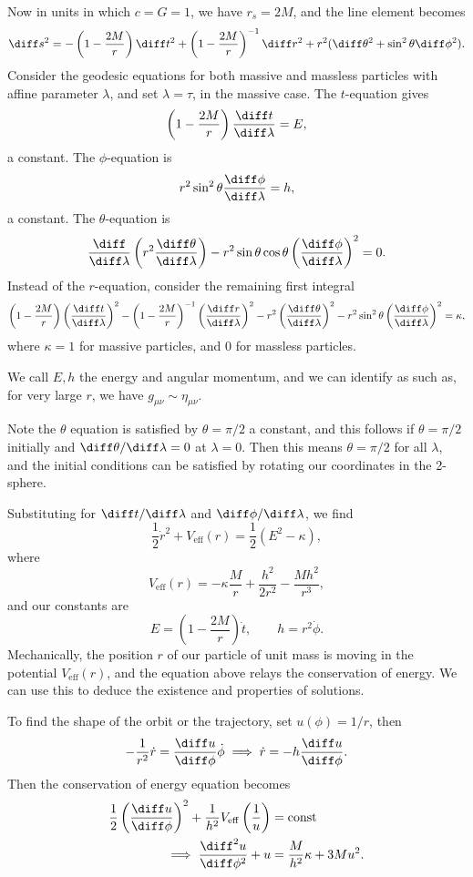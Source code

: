 \documentclass[12pt]{article}
\begin{document}
Now in units in which $c = G = 1$, we have $r_s = 2M$, and the line element becomes
 \[
\diff s^2 = - \left(1 - \frac{2M}{r} \right) \diff t^2 + \left(1 - \frac{2M}{r} \right)^{-1} \diff r^2 + r^2 (\diff \theta^2 + \sin^2 \theta \diff \phi^2).
\]
Consider the geodesic equations for both massive and massless particles with affine parameter $\lambda$, and set $\lambda = \tau$, in the massive case. The $t$-equation gives
\[
\left(1 - \frac{2M}{r} \right) \frac{\diff t}{\diff \lambda} = E,
\]
a constant. The $\phi$-equation is
\[
r^2 \sin^2 \theta \frac{\diff \phi}{\diff \lambda} = h,
\]
a constant. The $\theta$-equation is
\[
\frac{\diff}{\diff \lambda} \left( r^2 \frac{\diff \theta}{\diff \lambda} \right) - r^2 \sin \theta \cos \theta \left( \frac{\diff \phi}{\diff \lambda} \right)^2 = 0.
\]
Instead of the $r$-equation, consider the remaining first integral
\[
\left(1 - \frac{2M}{r} \right) \left(\frac{\diff t}{\diff \lambda} \right)^2 - \left(1 - \frac{2M}{r} \right)^{-1} \left(\frac{\diff r}{\diff \lambda} \right)^2 - r^2 \left( \frac{\diff \theta}{\diff \lambda} \right)^2 - r^2 \sin^2 \theta \left( \frac{\diff \phi}{\diff \lambda} \right)^2 = \kappa,
\]
where $\kappa = 1$ for massive particles, and $0$ for massless particles.

We call $E, h$ the energy and angular momentum, and we can identify as such as, for very large $r$, we have $g_{\mu \nu} \sim \eta_{\mu \nu}$.

Note the $\theta$ equation is satisfied by $\theta = \pi/2$ a constant, and this follows if $\theta = \pi/2$ initially and $\diff \theta/\diff \lambda = 0$ at $\lambda = 0$. Then this means $\theta = \pi/2$ for all $\lambda$, and the initial conditions can be satisfied by rotating our coordinates in the 2-sphere.

Substituting for $\diff t/\diff \lambda$ and $\diff \phi / \diff \lambda$, we find
\[
\frac{1}{2} \dot r^2 + V_{\mathrm{eff}}(r) = \frac{1}{2}(E^2 - \kappa),
\]
where
\[
V_{\mathrm{eff}}(r) = - \kappa \frac{M}{r} + \frac{h^2}{2r^2} - \frac{Mh^2}{r^3},
\]
and our constants are
\[
E = \left(1 - \frac{2M}{r} \right) \dot t, \qquad h = r^2 \dot \phi.
\]
Mechanically, the position $r$ of our particle of unit mass is moving in the potential $V_{\mathrm{eff}}(r)$, and the equation above relays the conservation of energy. We can use this to deduce the existence and properties of solutions.

To find the shape of the orbit or the trajectory, set $u(\phi) = 1/r$, then
\[
- \frac{1}{r^2} \dot r = \frac{\diff u}{\diff \phi} \dot \phi \implies \dot r = - h \frac{\diff u}{\diff \phi}.
\]
Then the conservation of energy equation becomes
\begin{align*}
	\frac{1}{2} \left( \frac{\diff u}{\diff \phi} \right)^2 + \frac{1}{h^2} V_{\mathrm{eff}}\left( \frac{1}{u} \right) &= \text{const} \\
	\implies \frac{\diff^2 u}{\diff \phi^2} + u &= \frac{M}{h^2} \kappa + 3 M u^2.
\end{align*}
\end{document}
